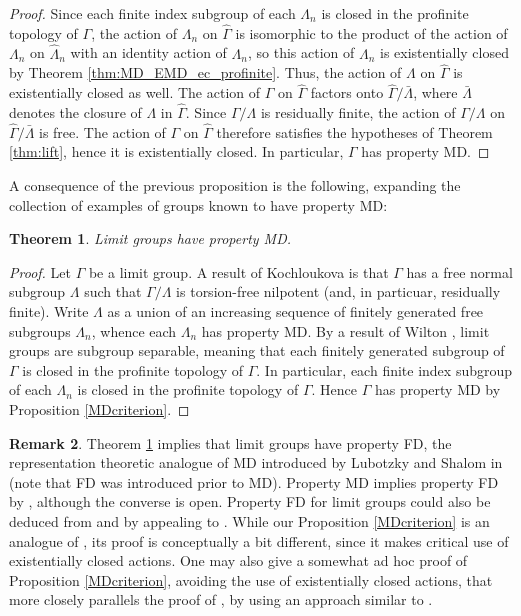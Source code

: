 \documentclass[12pt]{amsart}
\newtheorem{thm}{Theorem}[section]
\theoremstyle{definition}
\newtheorem{remark}[thm]{Remark}
\begin{document}
\begin{proof}
Since each finite index subgroup of each $\Lambda _n$ is closed in the profinite topology of $\Gamma$, the action of $\Lambda _n$ on $\hat{\Gamma}$ is isomorphic to the product of the action of $\Lambda _n$ on $\widehat{\Lambda}_n$ with an identity action of $\Lambda _n$, so this action of $\Lambda _n$ is existentially closed by Theorem \ref{thm:MD_EMD_ec_profinite}. Thus, the action of $\Lambda$ on $\hat{\Gamma}$ is existentially closed as well. The action of $\Gamma$ on $\hat{\Gamma}$ factors onto $\hat{\Gamma}/\bar{\Lambda}$, where $\bar{\Lambda}$ denotes the closure of $\Lambda$ in $\hat{\Gamma}$. Since $\Gamma /\Lambda$ is residually finite, the action of $\Gamma /\Lambda$ on $\hat{\Gamma}/\bar{\Lambda}$ is free. The action of $\Gamma$ on $\hat{\Gamma}$ therefore satisfies the hypotheses of Theorem \ref{thm:lift}, hence it is existentially closed. In particular, $\Gamma$ has property MD.
\end{proof}

A consequence of the previous proposition is the following, expanding the collection of examples of groups known to have property MD:

\begin{thm}\label{thm:Limit_MD}
Limit groups have property MD.
\end{thm}

\begin{proof}
Let $\Gamma$ be a limit group. A result of Kochloukova\cite[Corollary B]{Kochloukova} is that $\Gamma$ has a free normal subgroup $\Lambda$ such that $\Gamma/\Lambda$ is torsion-free nilpotent (and, in particuar, residually finite).  Write $\Lambda$ as a union of an increasing sequence of finitely generated free subgroups $\Lambda_n$, whence each $\Lambda_n$ has property MD.  By a result of Wilton \cite{wilton}, limit groups are subgroup separable, meaning that each finitely generated subgroup of $\Gamma$ is closed in the profinite topology of $\Gamma$.  In particular, each finite index subgroup of each $\Lambda_n$ is closed in the profinite topology of $\Gamma$.  Hence $\Gamma$ has property MD by Proposition \ref{MDcriterion}.
\end{proof}

\begin{remark}
Theorem \ref{thm:Limit_MD} implies that limit groups have property FD, the representation theoretic analogue of MD introduced by Lubotzky and Shalom in \cite{Lubotzky-Shalom} (note that FD was introduced prior to MD). Property MD implies property FD by \cite{kechrisweak}, although the converse is open. Property FD for limit groups could also be deduced from \cite{Kochloukova} and \cite{wilton} by appealing to \cite[Corollary 2.5]{Lubotzky-Shalom}. While our Proposition \ref{MDcriterion} is an analogue of \cite[Corollary 2.5]{Lubotzky-Shalom}, its proof is conceptually a bit different, since it makes critical use of existentially closed actions. One may also give a somewhat ad hoc proof of Proposition \ref{MDcriterion}, avoiding the use of existentially closed actions, that more closely parallels the proof of \cite[Corollary 2.5]{Lubotzky-Shalom}, by using an approach similar to \cite{BTD2}.
\end{remark}
\end{document}
